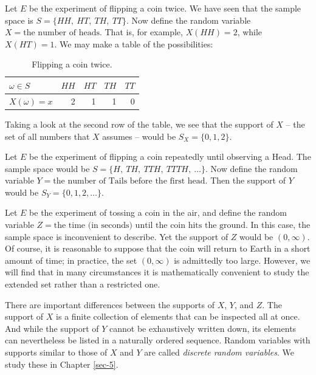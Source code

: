 \documentclass[captions=tableheading]{scrbook}
\begin{document}
\begin{example}
Let \(E\) be the experiment of flipping a coin twice. We have seen that the sample space is \( S = \{ HH,\ HT,\ TH,\ TT \} \). Now define the random variable \(X = \mbox{the number of heads}\). That is, for example, \(X(HH)=2\), while \(X(HT)=1\). We may make a table of the possibilities:

\begin{table}[htb]
\caption[Flipping a coin twice]{Flipping a coin twice.} \label{tab-flip-coin-twice}
\begin{center}
\begin{tabular}{lrrrr}
 \(\omega\in S\)  &  \(HH\)  &  \(HT\)  &  \(TH\)  &  \(TT\)  \\
\hline
 \(X(\omega)=x\)  &       2  &       1  &       1  &       0  \\
\end{tabular}
\end{center}
\end{table}


Taking a look at the second row of the table, we see that the support of \(X\) -- the set of all numbers that \(X\) assumes -- would be \( S_{X}= \{ 0,1,2 \} \).
\end{example}

\begin{example}
Let \(E\) be the experiment of flipping a coin repeatedly until observing a Head. The sample space would be \(S= \{ H,\ TH,\ TTH,\ TTTH,\ \ldots \} \). Now define the random variable \(Y=\mbox{the number of Tails before the first head}\). Then the support of \(Y\) would be \( S_{Y}= \{ 0,1,2,\ldots \} \).
\end{example}

\begin{example}
Let \(E\) be the experiment of tossing a coin in the air, and define the random variable \( Z = \mbox{the time (in seconds) until the coin hits the ground} \). In this case, the sample space is inconvenient to describe. Yet the support of \(Z\) would be \((0,\infty)\). Of course, it is reasonable to suppose that the coin will return to Earth in a short amount of time; in practice, the set \((0,\infty)\) is admittedly too large. However, we will find that in many circumstances it is mathematically convenient to study the extended set rather than a restricted one. 
\end{example}

There are important differences between the supports of \(X\), \(Y\), and \(Z\). The support of \(X\) is a finite collection of elements that can be inspected all at once. And while the support of \(Y\) cannot be exhaustively written down, its elements can nevertheless be listed in a naturally ordered sequence. Random variables with supports similar to those of \(X\) and \(Y\) are called \emph{discrete random variables}. We study these in Chapter \ref{sec-5}.
\end{document}
